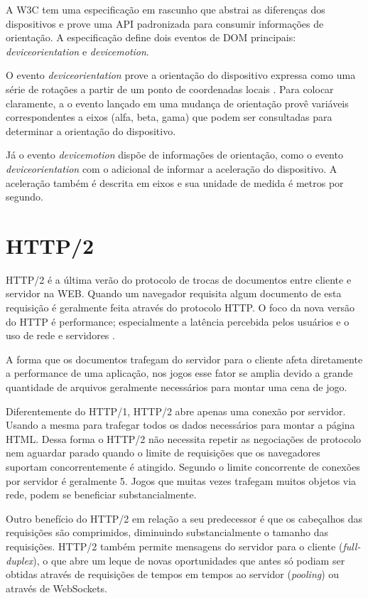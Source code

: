 A W3C tem uma especificação em rascunho que abstrai as diferenças dos
dispositivos e prove uma API padronizada para consumir informações
de orientação. A especificação define dois eventos de DOM
principais: \textit{deviceorientation} e \textit{devicemotion}. 

O evento \textit{deviceorientation} prove a orientação do
dispositivo expressa como uma série de rotações a partir de um
ponto de coordenadas locais \autocite{orientationSpec}. Para colocar
claramente, a o evento lançado em uma mudança de orientação provê
variáveis correspondentes a eixos (alfa, beta, gama) que podem ser
consultadas para determinar a orientação do dispositivo.

Já o evento \textit{devicemotion} dispõe de informações de
orientação, como o evento \textit{deviceorientation} com o adicional
de informar a aceleração do dispositivo. A aceleração também é descrita
em eixos e sua unidade de medida é metros por segundo.

\section{HTTP/2}
HTTP/2 é a última verão do protocolo de trocas de documentos entre
cliente e servidor na WEB. Quando um navegador requisita algum documento
de esta requisição é geralmente feita através do protocolo HTTP. O
foco da nova versão do HTTP é performance; especialmente a latência
percebida pelos usuários e o uso de rede e servidores \autocite{http2}.

A forma que os documentos trafegam do servidor para o
cliente afeta diretamente a performance de uma aplicação, nos jogos
esse fator se amplia devido a grande quantidade de arquivos geralmente
necessários para montar uma cena de jogo.

Diferentemente do HTTP/1, HTTP/2 abre apenas uma conexão por servidor.
Usando a mesma para trafegar todos os dados necessários para montar
a página HTML. Dessa forma o HTTP/2 não necessita repetir as
negociações de protocolo nem aguardar parado quando o limite de
requisições que os navegadores suportam concorrentemente é atingido.
Segundo \cite{gameAssetManagement} o limite concorrente de conexões por
servidor é geralmente 5. Jogos que muitas vezes trafegam muitos objetos
via rede, podem se beneficiar substancialmente.

Outro benefício do HTTP/2 em relação a seu predecessor é que
os cabeçalhos das requisições são comprimidos, diminuindo
substancialmente o tamanho das requisições. HTTP/2 também permite
mensagens do servidor para o cliente (\textit{full-duplex}), o
que abre um leque de novas oportunidades que antes só podiam ser
obtidas através de requisições de tempos em tempos ao servidor
(\textit{pooling}) ou através de WebSockets.

